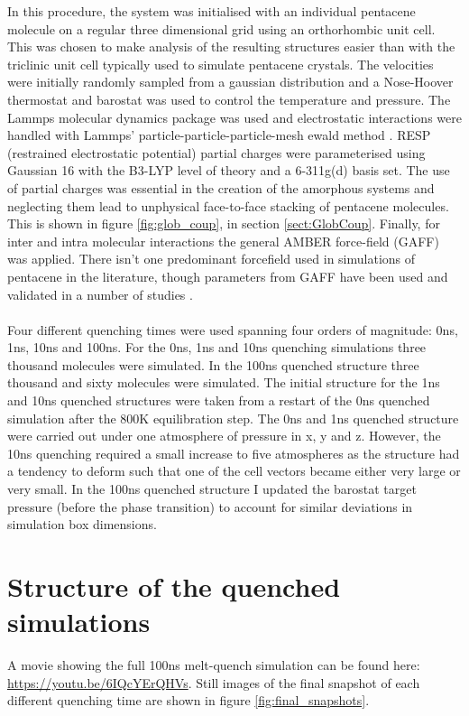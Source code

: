 \noindent In this procedure, the system was initialised with an individual pentacene molecule on a regular three dimensional grid using an orthorhombic unit cell. This was chosen to make analysis of the resulting structures easier than with the triclinic unit cell typically used to simulate pentacene crystals. The velocities were initially randomly sampled from a gaussian distribution and a Nose-Hoover thermostat and barostat was used to control the temperature and pressure. The Lammps molecular dynamics package was used \cite{LammpsMain, LammpsURL} and electrostatic interactions were handled with Lammps' particle-particle-particle-mesh ewald method \cite{LammpsPPPME}. RESP \cite{RESP} (restrained electrostatic potential) partial charges were parameterised using Gaussian 16 \cite{g16} with the B3-LYP\cite{B3,LYP} level of theory and a 6-311g(d) basis set. The use of partial charges was essential in the creation of the amorphous systems and neglecting them lead to unphysical face-to-face stacking of pentacene molecules. This is shown in figure \ref{fig:glob_coup}, in section \ref{sect:GlobCoup}. Finally, for inter and intra molecular interactions the general AMBER force-field \cite{GAFF} (GAFF) was applied. There isn't one predominant forcefield used in simulations of pentacene in the literature, though parameters from GAFF have been used and validated in a number of studies \cite{C0JM01577F, Yoneya2012, PentCrystallisation, MILLER201728, Wang2011, C6CP06436A, doi:10.1246/cl.180450}.
\\\\
Four different quenching times were used spanning four orders of magnitude: 0ns, 1ns, 10ns and 100ns. For the 0ns, 1ns and 10ns quenching simulations three thousand molecules were simulated. In the 100ns quenched structure three thousand and sixty molecules were simulated. The initial structure for the 1ns and 10ns quenched structures were taken from a restart of the 0ns quenched simulation after the 800K equilibration step. The 0ns and 1ns quenched structure were carried out under one atmosphere of pressure in x, y and z. However, the 10ns quenching required a small increase to five atmospheres as the structure had a tendency to deform such that one of the cell vectors became either very large or very small. In the 100ns quenched structure I updated the barostat target pressure (before the phase transition) to account for similar deviations in simulation box dimensions.
\section{Structure of the quenched simulations}
A movie showing the full 100ns melt-quench simulation can be found here: \href{https://youtu.be/6IQcYErQHVs}{https://youtu.be/6IQcYErQHVs}. Still images of the final snapshot of each different quenching time are shown in figure \ref{fig:final_snapshots}.
